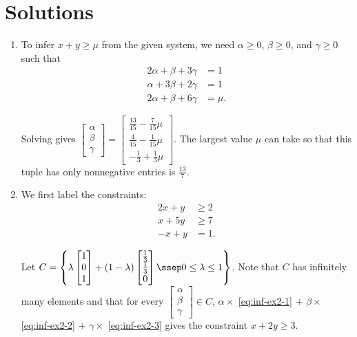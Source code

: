 \section*{Solutions}\label{solutions-2}

\begin{enumerate}
\def\labelenumi{\arabic{enumi}.}
\tightlist
\item
  To infer \(x + y \geq \mu\) from the given system, we need
  \(\alpha \geq 0\), \(\beta \geq 0\), and \(\gamma \geq 0\) such that
  \begin{align*}
    2\alpha + \beta + 3\gamma & = 1\\
     \alpha + 3\beta + 2\gamma & = 1\\
    2\alpha + \beta + 6\gamma & = \mu.
  \end{align*}

  Solving gives
  \(\begin{bmatrix} \alpha \\ \beta \\ \gamma\end{bmatrix} = \begin{bmatrix} \frac{13}{15} - \frac{7}{15} \mu \\ \frac{4}{15}-\frac{1}{15} \mu \\ -\frac{1}{3} + \frac{1}{3}\mu\end{bmatrix}\).
  The largest value \(\mu\) can take so that this tuple has only
  nonnegative entries is \(\frac{13}{7}\).
\item
  We first label the constraints:
  \begin{align}
  2x + y & \geq 2 \label{eq:inf-ex2-1} \\
  x + 5y & \geq 7 \label{eq:inf-ex2-2} \\
  -x + y & = 1.  \label{eq:inf-ex2-3}
  \end{align}

  Let
  \(C = \left \{ \lambda \begin{bmatrix} 1 \\ 0 \\ 1\end{bmatrix} + (1-\lambda)\begin{bmatrix} \frac{1}{3} \\ \frac{1}{3} \\ 0 \end{bmatrix} \ssep 0 \leq \lambda \leq 1 \right\}\).
  Note that \(C\) has infinitely many elements and that for every
  \(\begin{bmatrix} \alpha \\ \beta \\ \gamma\end{bmatrix} \in C\),
  \(\alpha \times\) \eqref{eq:inf-ex2-1} \(+\) \(\beta \times\)
  \eqref{eq:inf-ex2-2} \(+\) \(\gamma \times\) \eqref{eq:inf-ex2-3} gives
  the constraint \(x + 2y \geq 3\).


\end{enumerate}
